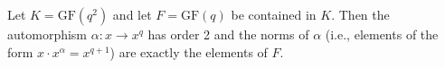 Let $K = \mathrm{GF}(q^2)$ and let $F = \mathrm{GF}(q)$ be contained in $K$. Then the automorphism $\alpha : x \to x^q$ has order 2 and the norms of $\alpha$ (i.e., elements of the form $x \cdot x^\alpha = x^{q+1}$) are exactly the elements of $F$.
